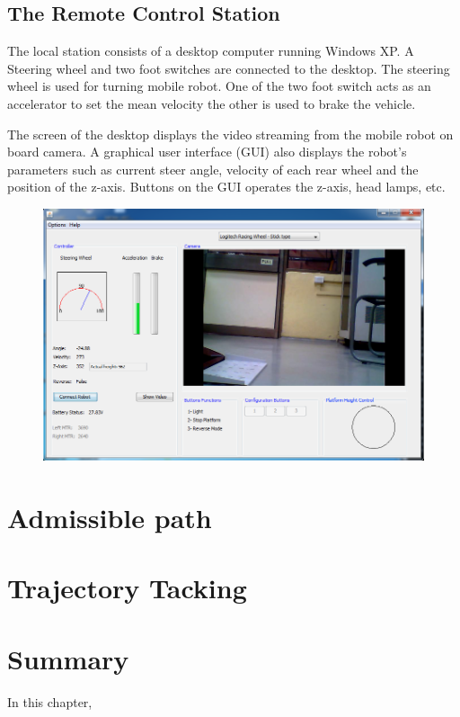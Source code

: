 \subsection{The Remote Control Station}   
The local station consists of a desktop computer running Windows XP. A Steering wheel and two foot switches are connected to the desktop. The steering wheel is used for turning  mobile robot. One of the two foot switch acts as an accelerator to set the mean velocity the other  is used to brake the vehicle.

The screen of the desktop displays the video streaming  from the mobile robot on board camera. A graphical user  interface (GUI) also displays the robot's parameters such as current steer angle, velocity of each rear wheel and the position of the z-axis. Buttons on the GUI operates the z-axis, head lamps, etc.

\begin{figure}
	\includegraphics[width=\linewidth,keepaspectratio]{Chapter5/fig/gui}
	\label{fig:Gui} 
\end{figure}

\section{Admissible path}
\section{Trajectory Tacking}


\section{Summary}
In this chapter, 